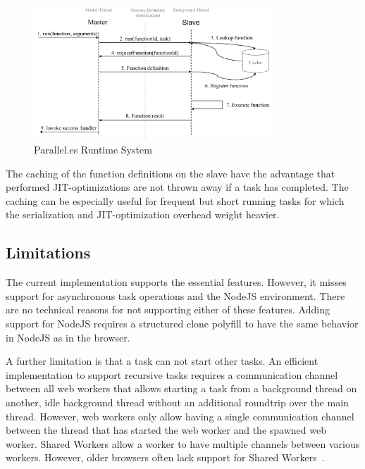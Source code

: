 \begin{figure}
	\centering
	\includegraphics[width=0.8\textwidth]{runtime-system.pdf}

	\caption{Parallel.es Runtime System}
	\label{fig:runtime-system}
\end{figure}

The caching of the function definitions on the slave have the advantage that performed JIT-optimizations are not thrown away if a task has completed. The caching can be especially useful for frequent but short running tasks for which the serialization and JIT-optimization overhead weight heavier.


\subsection{Limitations}
The current implementation supports the essential features. However, it misses support for asynchronous task operations and the NodeJS environment. There are no technical reasons for not supporting either of these features. Adding support for NodeJS requires a structured clone polyfill to have the same behavior in NodeJS as in the browser.

A further limitation is that a task can not start other tasks. An efficient implementation to support recursive tasks requires a communication channel between all web workers that allows starting a task from a background thread on another, idle background thread without an additional roundtrip over the main thread. However, web workers only allow having a single communication channel between the thread that has started the web worker and the spawned web worker. Shared Workers allow a worker to have multiple channels between various workers. However, older browsers often lack support for Shared Workers~\cite[section 4.6.4]{w3cWebWorker}.
